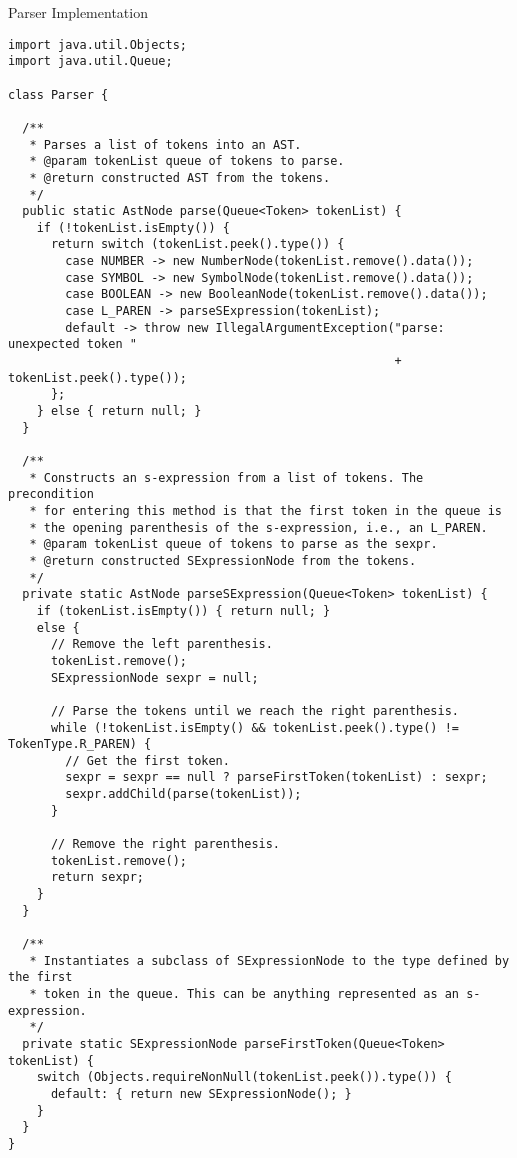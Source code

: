 \begin{verbnobox}[\footnotesize]
\begin{verbnobox}[\footnotesize]
\begin{verbnobox}[\footnotesize]
\begin{verbnobox}[\footnotesize]
\begin{cl}{Parser Implementation}
\begin{lstlisting}[language=MyJava]
import java.util.Objects;
import java.util.Queue;

class Parser {

  /**
   * Parses a list of tokens into an AST.
   * @param tokenList queue of tokens to parse.
   * @return constructed AST from the tokens.
   */
  public static AstNode parse(Queue<Token> tokenList) {
    if (!tokenList.isEmpty()) {
      return switch (tokenList.peek().type()) {
        case NUMBER -> new NumberNode(tokenList.remove().data());
        case SYMBOL -> new SymbolNode(tokenList.remove().data());
        case BOOLEAN -> new BooleanNode(tokenList.remove().data());
        case L_PAREN -> parseSExpression(tokenList);
        default -> throw new IllegalArgumentException("parse: unexpected token " 
                                                      + tokenList.peek().type());
      };
    } else { return null; }
  }

  /**
   * Constructs an s-expression from a list of tokens. The precondition
   * for entering this method is that the first token in the queue is
   * the opening parenthesis of the s-expression, i.e., an L_PAREN.
   * @param tokenList queue of tokens to parse as the sexpr.
   * @return constructed SExpressionNode from the tokens.
   */
  private static AstNode parseSExpression(Queue<Token> tokenList) {
    if (tokenList.isEmpty()) { return null; }
    else {
      // Remove the left parenthesis.
      tokenList.remove();
      SExpressionNode sexpr = null;

      // Parse the tokens until we reach the right parenthesis.
      while (!tokenList.isEmpty() && tokenList.peek().type() != TokenType.R_PAREN) {
        // Get the first token.
        sexpr = sexpr == null ? parseFirstToken(tokenList) : sexpr;
        sexpr.addChild(parse(tokenList));
      }

      // Remove the right parenthesis.
      tokenList.remove();
      return sexpr;
    }
  }

  /**
   * Instantiates a subclass of SExpressionNode to the type defined by the first
   * token in the queue. This can be anything represented as an s-expression.
   */
  private static SExpressionNode parseFirstToken(Queue<Token> tokenList) {
    switch (Objects.requireNonNull(tokenList.peek()).type()) {
      default: { return new SExpressionNode(); }
    }
  }
}
\end{lstlisting}
\end{cl}


\end{verbnobox}
\end{verbnobox}
\end{verbnobox}
\end{verbnobox}
